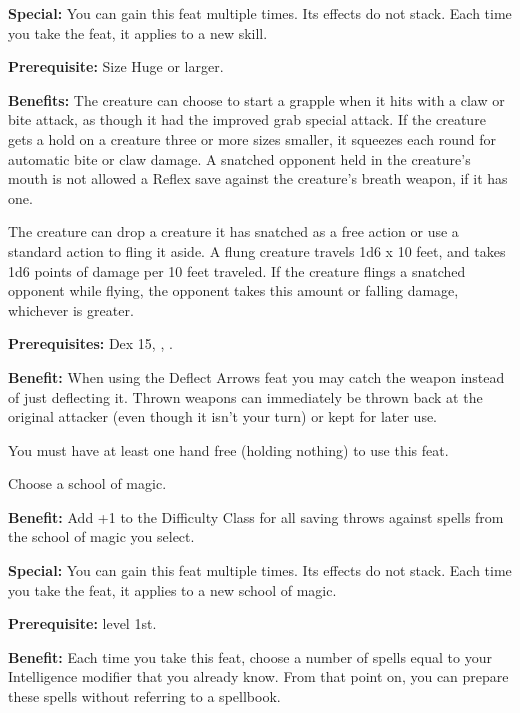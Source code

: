 \textbf{Special:} You can gain this feat multiple times. Its effects do not stack. 
Each time you take the feat, it applies to a new skill.


\textbf{Prerequisite:} Size Huge or larger.

\textbf{Benefits:} The creature can choose to start a grapple when it hits with 
a claw or bite attack, as though it had the improved grab special attack. If the 
creature gets a hold on a creature three or more sizes smaller, it squeezes each 
round for automatic bite or claw damage. A snatched opponent held in the creature's 
mouth is not allowed a Reflex save against the creature's breath weapon, if it 
has one.

The creature can drop a creature it has snatched as a free action or use a standard 
action to fling it aside. A flung creature travels 1d6 x 10 feet, and takes 1d6 
points of damage per 10 feet traveled. If the creature flings a snatched opponent 
while flying, the opponent takes this amount or falling damage, whichever is greater.


\textbf{Prerequisites:} Dex 15, , .

\textbf{Benefit:} When using the Deflect Arrows feat you may catch the weapon instead 
of just deflecting it. Thrown weapons can immediately be thrown back at the original 
attacker (even though it isn't your turn) or kept for later use.

You must have at least one hand free (holding nothing) to use this feat.


Choose a school of magic.

\textbf{Benefit:} Add +1 to the Difficulty Class for all saving throws against 
spells from the school of magic you select.

\textbf{Special:} You can gain this feat multiple times. Its effects do not stack. 
Each time you take the feat, it applies to a new school of magic.


\textbf{Prerequisite:}  level 1st.

\textbf{Benefit:} Each time you take this feat, choose a number of spells equal 
to your Intelligence modifier that you already know. From that point on, you can 
prepare these spells without referring to a spellbook.

